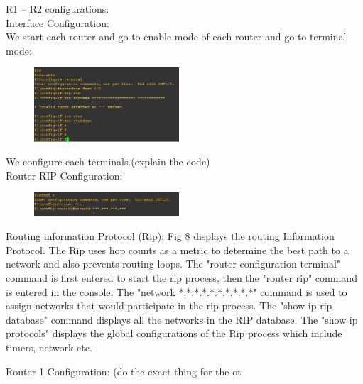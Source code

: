 \documentclass{article}
\begin{document}
R1 – R2 configurations:\\
Interface Configuration:\\
We start each router and go to enable mode of each router and go to terminal mode:

\begin{figure}[H]
	\begin{center}
		\includegraphics[width=0.48\textwidth]{Terminalconf.jpg}
	\end{center}
	\caption{\small  \newline}
	\label{fig:Prd}
\end{figure}

We configure each terminals.(explain the code)\\

Router RIP Configuration:

\begin{figure}[H]
	\begin{center}
		\includegraphics[width=0.48\textwidth]{RouterRip.jpg}
	\end{center}
	\caption{\small  \newline}
	\label{fig:Prd}
\end{figure}
Routing information Protocol (Rip): Fig 8 displays the routing Information Protocol. The Rip uses hop counts as a metric to determine the best path to a network and also prevents routing loops. The "router configuration terminal" command is first entered to start the rip process, then the "router rip" command is entered in the console, The "network *.*.*.*.*.*.*.*.*.*" command is used to assign networks that would participate in the rip process. The "show ip rip database" command displays all the networks in the RIP database. The "show ip protocols" displays the global configurations of the Rip process which include timers, network etc.

Router 1 Configuration: (do the exact thing for the ot
\end{document}
